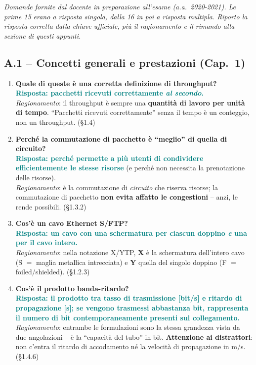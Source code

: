 \documentclass[12pt, a4paper]{article}
\begin{document}
\textit{Domande fornite dal docente in preparazione all'esame (a.a.\ 2020-2021). Le prime 15 erano a risposta singola, dalla 16 in poi a risposta multipla. Riporto la risposta corretta dalla chiave ufficiale, più il ragionamento e il rimando alla sezione di questi appunti.}

\subsection*{A.1 -- Concetti generali e prestazioni (Cap.\ 1)}

\begin{enumerate}[leftmargin=*]

\item \textbf{Quale di queste è una corretta definizione di throughput?}\\
\textcolor{teal}{\textbf{Risposta: pacchetti ricevuti correttamente \emph{al secondo}.}}\\
\textit{Ragionamento}: il throughput è sempre una \textbf{quantità di lavoro per unità di tempo}. ``Pacchetti ricevuti correttamente'' senza il tempo è un conteggio, non un throughput. (\S1.4)

\item \textbf{Perché la commutazione di pacchetto è ``meglio'' di quella di circuito?}\\
\textcolor{teal}{\textbf{Risposta: perché permette a più utenti di condividere efficientemente le stesse risorse}} (e perché non necessita la prenotazione delle risorse).\\
\textit{Ragionamento}: è la commutazione di \emph{circuito} che riserva risorse; la commutazione di pacchetto \textbf{non evita affatto le congestioni} -- anzi, le rende possibili. (\S1.3.2)

\item \textbf{Cos'è un cavo Ethernet S/FTP?}\\
\textcolor{teal}{\textbf{Risposta: un cavo con una schermatura per ciascun doppino \emph{e} una per il cavo intero.}}\\
\textit{Ragionamento}: nella notazione X/YTP, \textbf{X} è la schermatura dell'intero cavo (S $=$ maglia metallica intrecciata) e \textbf{Y} quella del singolo doppino (F $=$ foiled/shielded). (\S1.2.3)

\item \textbf{Cos'è il prodotto banda-ritardo?}\\
\textcolor{teal}{\textbf{Risposta: il prodotto tra tasso di trasmissione [bit/s] e ritardo di propagazione [s]; se vengono trasmessi abbastanza bit, rappresenta il numero di bit contemporaneamente presenti sul collegamento.}}\\
\textit{Ragionamento}: entrambe le formulazioni sono la stessa grandezza vista da due angolazioni -- è la ``capacità del tubo'' in bit. \textbf{Attenzione ai distrattori}: non c'entra il ritardo di accodamento né la velocità di propagazione in m/s. (\S1.4.6)


\end{enumerate}
\end{document}
